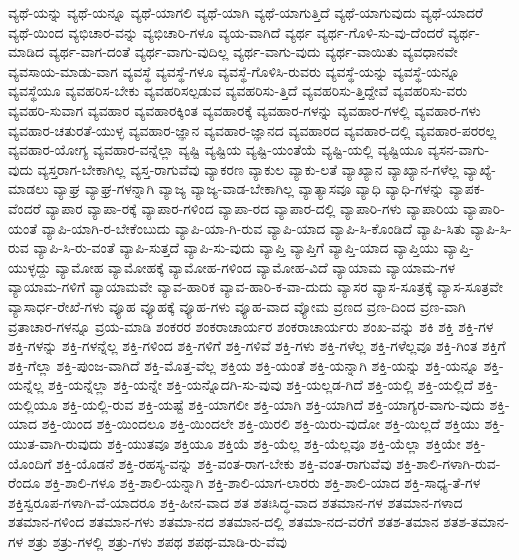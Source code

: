 {ವ್ಯಥೆ-ಯನ್ನು
ವ್ಯಥೆ-ಯನ್ನೂ
ವ್ಯಥೆ-ಯಾಗಲಿ
ವ್ಯಥೆ-ಯಾಗಿ
ವ್ಯಥೆ-ಯಾಗುತ್ತಿದೆ
ವ್ಯಥೆ-ಯಾಗುವುದು
ವ್ಯಥೆ-ಯಾದರೆ
ವ್ಯಥೆ-ಯಿಂದ
ವ್ಯಭಿಚಾರ-ವನ್ನು
ವ್ಯಭಿಚಾರಿ-ಗಳೂ
ವ್ಯಯ-ವಾಗಿದೆ
ವ್ಯರ್ಥ
ವ್ಯರ್ಥ-ಗೊಳಿ-ಸು-ವು-ದೆಂದರೆ
ವ್ಯರ್ಥ-ಮಾಡಿದ
ವ್ಯರ್ಥ-ವಾಗ-ದಂತೆ
ವ್ಯರ್ಥ-ವಾಗು-ವುದಿಲ್ಲ
ವ್ಯರ್ಥ-ವಾಗು-ವುದು
ವ್ಯರ್ಥ-ವಾಯಿತು
ವ್ಯವಧಾನವೇ
ವ್ಯವಸಾಯ-ಮಾಡು-ವಾಗ
ವ್ಯವಸ್ಥೆ
ವ್ಯವಸ್ಥೆ-ಗಳೂ
ವ್ಯವಸ್ಥೆ-ಗೊಳಿಸಿ-ರುವರು
ವ್ಯವಸ್ಥೆ-ಯನ್ನು
ವ್ಯವಸ್ಥೆ-ಯನ್ನೂ
ವ್ಯವಸ್ಥೆಯೂ
ವ್ಯವಹರಿಸ-ಬೇಕು
ವ್ಯವಹರಿಸಲ್ಪಡುವ
ವ್ಯವಹರಿಸು-ತ್ತಿದೆ
ವ್ಯವಹರಿಸು-ತ್ತಿದ್ದೇವೆ
ವ್ಯವಹರಿಸು-ವರು
ವ್ಯವಹರಿ-ಸುವಾಗ
ವ್ಯವಹಾರ
ವ್ಯವಹಾರಕ್ಕಿಂತ
ವ್ಯವಹಾರಕ್ಕೆ
ವ್ಯವಹಾರ-ಗಳನ್ನು
ವ್ಯವಹಾರ-ಗಳಲ್ಲಿ
ವ್ಯವಹಾರ-ಗಳು
ವ್ಯವಹಾರ-ಚತುರತೆ-ಯುಳ್ಳ
ವ್ಯವಹಾರ-ಜ್ಞಾನ
ವ್ಯವಹಾರ-ಜ್ಞಾನದ
ವ್ಯವಹಾರದ
ವ್ಯವಹಾರ-ದಲ್ಲಿ
ವ್ಯವಹಾರ-ಪರರಲ್ಲ
ವ್ಯವಹಾರ-ಯೋಗ್ಯ
ವ್ಯವಹಾರ-ವನ್ನೆಲ್ಲಾ
ವ್ಯಷ್ಟಿ
ವ್ಯಷ್ಟಿಯ
ವ್ಯಷ್ಟಿ-ಯಂತೆಯೆ
ವ್ಯಷ್ಟಿ-ಯಲ್ಲಿ
ವ್ಯಷ್ಟಿಯೂ
ವ್ಯಸನ-ವಾಗು-ವುದು
ವ್ಯಸ್ತರಾಗ-ಬೇಕಾಗಿಲ್ಲ
ವ್ಯಸ್ತ-ರಾಗುವೆವು
ವ್ಯಾಕರಣ
ವ್ಯಾಕುಲ
ವ್ಯಾಕು-ಲತೆ
ವ್ಯಾಖ್ಯಾನ
ವ್ಯಾಖ್ಯಾನ-ಗಳೆಲ್ಲ
ವ್ಯಾಖ್ಯೆ-ಮಾಡಲು
ವ್ಯಾಘ್ರ
ವ್ಯಾಘ್ರ-ಗಳನ್ನಾಗಿ
ವ್ಯಾಜ್ಯ
ವ್ಯಾಜ್ಯ-ವಾಡ-ಬೇಕಾಗಿಲ್ಲ
ವ್ಯಾತ್ಯಾಸವೂ
ವ್ಯಾಧಿ
ವ್ಯಾಧಿ-ಗಳನ್ನು
ವ್ಯಾಪಕ-ವೆಂದರೆ
ವ್ಯಾಪಾರ
ವ್ಯಾಪಾ-ರಕ್ಕೆ
ವ್ಯಾಪಾರ-ಗಳಿಂದ
ವ್ಯಾಪಾ-ರದ
ವ್ಯಾಪಾರ-ದಲ್ಲಿ
ವ್ಯಾಪಾರಿ-ಗಳು
ವ್ಯಾಪಾರಿಯ
ವ್ಯಾಪಾರಿ-ಯಂತೆ
ವ್ಯಾಪಿ-ಯಾಗಿ-ರ-ಬೇಕೆಂಬುದು
ವ್ಯಾಪಿ-ಯಾ-ಗಿ-ರುವ
ವ್ಯಾಪಿ-ಯಾದ
ವ್ಯಾಪಿ-ಸಿ-ಕೊಂಡಿದೆ
ವ್ಯಾಪಿ-ಸಿತು
ವ್ಯಾಪಿ-ಸಿ-ರುವ
ವ್ಯಾಪಿ-ಸಿ-ರು-ವಂತೆ
ವ್ಯಾಪಿ-ಸುತ್ತದೆ
ವ್ಯಾಪಿ-ಸು-ವುದು
ವ್ಯಾಪ್ತಿ
ವ್ಯಾಪ್ತಿಗೆ
ವ್ಯಾಪ್ತಿ-ಯಾದ
ವ್ಯಾಪ್ತಿಯು
ವ್ಯಾಪ್ತಿ-ಯುಳ್ಳದ್ದು
ವ್ಯಾಮೋಹ
ವ್ಯಾಮೋಹಕ್ಕೆ
ವ್ಯಾಮೋಹ-ಗಳಿಂದ
ವ್ಯಾಮೋಹ-ವಿದೆ
ವ್ಯಾಯಾಮ
ವ್ಯಾಯಾಮ-ಗಳ
ವ್ಯಾಯಾಮ-ಗಳಿಗೆ
ವ್ಯಾಯಾಮವೇ
ವ್ಯಾವ-ಹಾರಿಕ
ವ್ಯಾವ-ಹಾರಿ-ಕ-ವಾ-ದುದು
ವ್ಯಾಸರ
ವ್ಯಾಸ-ಸೂತ್ರಕ್ಕೆ
ವ್ಯಾಸ-ಸೂತ್ರವೇ
ವ್ಯಾಸಾರ್ಧ-ರೇಖೆ-ಗಳು
ವ್ಯೂಹ
ವ್ಯೂಹಕ್ಕೆ
ವ್ಯೂಹ-ಗಳು
ವ್ಯೂಹ-ವಾದ
ವ್ಯೋಮ
ವ್ರಣದ
ವ್ರಣ-ದಿಂದ
ವ್ರಣ-ವಾಗಿ
ವ್ರತಾಚಾರ-ಗಳನ್ನೂ
ವ್ರಯ-ಮಾಡಿ
ಶಂಕರರ
ಶಂಕರಾಚಾರ್ಯರ
ಶಂಕರಾಚಾರ್ಯರು
ಶಂಖ-ವನ್ನು
ಶಕಿ
ಶಕ್ತಿ
ಶಕ್ತಿ-ಗಳ
ಶಕ್ತಿ-ಗಳನ್ನು
ಶಕ್ತಿ-ಗಳನ್ನೆಲ್ಲ
ಶಕ್ತಿ-ಗಳಿಂದ
ಶಕ್ತಿ-ಗಳಿಗೆ
ಶಕ್ತಿ-ಗಳಿವೆ
ಶಕ್ತಿ-ಗಳು
ಶಕ್ತಿ-ಗಳೆಲ್ಲ
ಶಕ್ತಿ-ಗಳೆಲ್ಲವೂ
ಶಕ್ತಿ-ಗಿಂತ
ಶಕ್ತಿಗೆ
ಶಕ್ತಿ-ಗೆಲ್ಲಾ
ಶಕ್ತಿ-ಪುಂಜ-ವಾಗಿದೆ
ಶಕ್ತಿ-ಮೊತ್ತ-ವೆಲ್ಲ
ಶಕ್ತಿಯ
ಶಕ್ತಿ-ಯಂತೆ
ಶಕ್ತಿ-ಯನ್ನಾಗಿ
ಶಕ್ತಿ-ಯನ್ನು
ಶಕ್ತಿ-ಯನ್ನೂ
ಶಕ್ತಿ-ಯನ್ನೆಲ್ಲ
ಶಕ್ತಿ-ಯನ್ನೆಲ್ಲಾ
ಶಕ್ತಿ-ಯನ್ನೇ
ಶಕ್ತಿ-ಯನ್ನೊದಗಿ-ಸು-ವುವು
ಶಕ್ತಿ-ಯಲ್ಲಡ-ಗಿದೆ
ಶಕ್ತಿ-ಯಲ್ಲಿ
ಶಕ್ತಿ-ಯಲ್ಲಿದೆ
ಶಕ್ತಿ-ಯಲ್ಲಿಯೂ
ಶಕ್ತಿ-ಯಲ್ಲಿ-ರುವ
ಶಕ್ತಿ-ಯಷ್ಟೆ
ಶಕ್ತಿ-ಯಾಗಲೀ
ಶಕ್ತಿ-ಯಾಗಿ
ಶಕ್ತಿ-ಯಾಗಿದೆ
ಶಕ್ತಿ-ಯಾಗ್ಯರ-ವಾಗು-ವುದು
ಶಕ್ತಿ-ಯಾದ
ಶಕ್ತಿ-ಯಿಂದ
ಶಕ್ತಿ-ಯಿಂದಲೂ
ಶಕ್ತಿ-ಯಿಂದಲೇ
ಶಕ್ತಿ-ಯಿರಲಿ
ಶಕ್ತಿ-ಯಿರು-ವುದೋ
ಶಕ್ತಿ-ಯಿಲ್ಲದೆ
ಶಕ್ತಿಯು
ಶಕ್ತಿ-ಯುತ-ವಾಗಿ-ರುವುದು
ಶಕ್ತಿ-ಯುತವೂ
ಶಕ್ತಿಯೂ
ಶಕ್ತಿಯೆ
ಶಕ್ತಿ-ಯೆಲ್ಲ
ಶಕ್ತಿ-ಯೆಲ್ಲವೂ
ಶಕ್ತಿ-ಯೆಲ್ಲಾ
ಶಕ್ತಿಯೇ
ಶಕ್ತಿ-ಯೊಂದಿಗೆ
ಶಕ್ತಿ-ಯೊಡನೆ
ಶಕ್ತಿ-ರಹಸ್ಯ-ವನ್ನು
ಶಕ್ತಿ-ವಂತ-ರಾಗ-ಬೇಕು
ಶಕ್ತಿ-ವಂತ-ರಾಗುವೆವು
ಶಕ್ತಿ-ಶಾಲಿ-ಗಳಾಗಿ-ರುವ-ರೆಂದೂ
ಶಕ್ತಿ-ಶಾಲಿ-ಗಳೂ
ಶಕ್ತಿ-ಶಾಲಿ-ಯನ್ನಾಗಿ
ಶಕ್ತಿ-ಶಾಲಿ-ಯಾಗ-ಲಾರರು
ಶಕ್ತಿ-ಶಾಲಿ-ಯಾದ
ಶಕ್ತಿ-ಸಾಧ್ಯ-ತೆ-ಗಳ
ಶಕ್ತಿಸ್ವರೂಪ-ಗಳಾಗಿ-ವೆ-ಯಾದರೂ
ಶಕ್ತಿ-ಹೀನ-ವಾದ
ಶತ
ಶತಃಸಿದ್ಧ-ವಾದ
ಶತಮಾನ-ಗಳ
ಶತಮಾನ-ಗಳಾದ
ಶತಮಾನ-ಗಳಿಂದ
ಶತಮಾನ-ಗಳು
ಶತಮಾ-ನದ
ಶತಮಾನ-ದಲ್ಲಿ
ಶತಮಾ-ನದ-ವರೆಗೆ
ಶತಶ-ತಮಾನ
ಶತಶ-ತಮಾನ-ಗಳ
ಶತ್ರು
ಶತ್ರು-ಗಳಲ್ಲಿ
ಶತ್ರು-ಗಳು
ಶಪಥ
ಶಪಥ-ಮಾಡಿ-ರು-ವೆವು
}
